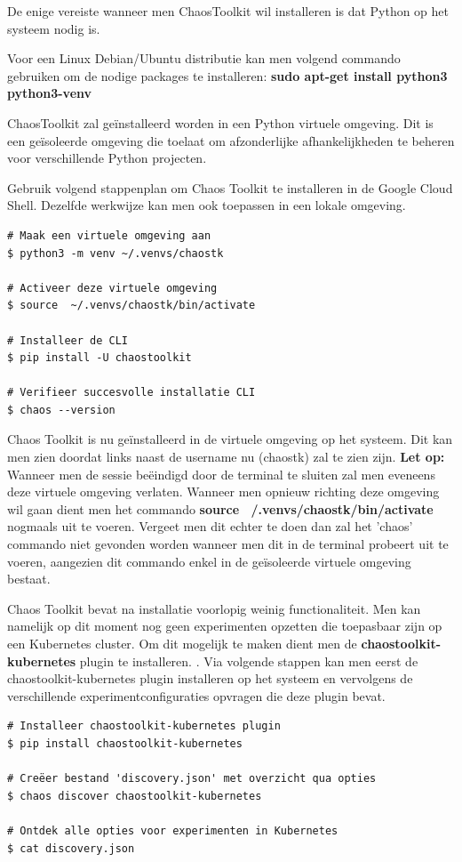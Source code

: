 De enige vereiste wanneer men ChaosToolkit wil installeren is dat Python op het systeem nodig is. \autocite{ChaosToolkit2022b}

Voor een Linux Debian/Ubuntu distributie kan men volgend commando gebruiken om de nodige packages te installeren: {\bf sudo apt-get install python3 python3-venv}
 
ChaosToolkit zal geïnstalleerd worden in een Python virtuele omgeving. Dit is een geïsoleerde omgeving die toelaat om afzonderlijke afhankelijkheden te beheren voor verschillende Python projecten. \autocite{UniMinnesota2022}

Gebruik volgend stappenplan om Chaos Toolkit te installeren in de Google Cloud Shell. Dezelfde werkwijze kan men ook toepassen in een lokale omgeving.
\begin{lstlisting}
# Maak een virtuele omgeving aan
$ python3 -m venv ~/.venvs/chaostk

# Activeer deze virtuele omgeving
$ source  ~/.venvs/chaostk/bin/activate

# Installeer de CLI
$ pip install -U chaostoolkit

# Verifieer succesvolle installatie CLI
$ chaos --version
\end{lstlisting}

Chaos Toolkit is nu geïnstalleerd in de virtuele omgeving op het systeem. Dit kan men zien doordat links naast de username nu (chaostk) zal te zien zijn. 
{\bf Let op:} Wanneer men de sessie beëindigd door de terminal te sluiten zal men eveneens deze virtuele omgeving verlaten. Wanneer men opnieuw richting deze omgeving wil gaan dient men het commando {\bf source  ~/.venvs/chaostk/bin/activate} nogmaals uit te voeren. Vergeet men dit echter te doen dan zal het 'chaos' commando niet gevonden worden wanneer men dit in de terminal probeert uit te voeren, aangezien dit commando enkel in de geïsoleerde virtuele omgeving bestaat.

Chaos Toolkit bevat na installatie voorlopig weinig functionaliteit. Men kan namelijk op dit moment nog geen experimenten opzetten die toepasbaar zijn op een Kubernetes cluster. Om dit mogelijk te maken dient men de {\bf chaostoolkit-kubernetes} plugin te installeren. \autocite{ChaosToolkit2022}. 
Via volgende stappen kan men eerst de chaostoolkit-kubernetes plugin installeren op het systeem en vervolgens de verschillende experimentconfiguraties opvragen die deze plugin bevat.
\begin{lstlisting} 
# Installeer chaostoolkit-kubernetes plugin
$ pip install chaostoolkit-kubernetes

# Creëer bestand 'discovery.json' met overzicht qua opties
$ chaos discover chaostoolkit-kubernetes

# Ontdek alle opties voor experimenten in Kubernetes
$ cat discovery.json
\end{lstlisting}


